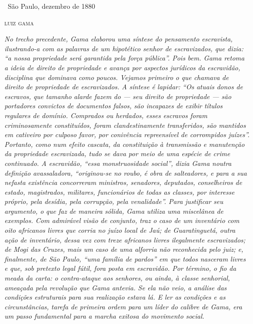 \hfill\ São Paulo, dezembro de 1880

\hfill\textsc{luiz gama}


\begin{resumo}
\emph{No trecho precedente, Gama elaborou uma síntese do pensamento
escravista, ilustrando-a com as palavras de um hipotético senhor de
escravizados, que dizia: ``a nossa propriedade será garantida pela força
pública''. Pois bem. Gama retoma a ideia de direito de propriedade e
avança por aspectos jurídicos da escravidão, disciplina que dominava
como poucos. Vejamos primeiro o que chamava de direito de propriedade de
escravizados. A síntese é lapidar: ``Os atuais donos de escravos, que
tamanho alarde fazem do --- seu direito de propriedade --- são portadores
convictos de documentos falsos, são incapazes de exibir títulos
regulares de domínio. Comprados ou herdados, esses escravos foram
criminosamente constituídos, foram clandestinamente transferidos, são
mantidos em cativeiro por culposo favor, por conivência repreensível de
corrompidos juízes''. Portanto, como num efeito cascata, da constituição
à transmissão e manutenção da propriedade escravizada, tudo se dava por
meio de uma espécie de crime continuado. A escravidão, ``essa
monstruosidade social'', dizia Gama noutra definição avassaladora,
``originou-se no roubo, é obra de salteadores, e para a sua nefasta
existência concorreram ministros, senadores, deputados, conselheiros de
estado, magistrados, militares, funcionários de todas as classes, por
interesse próprio, pela desídia, pela corrupção, pela venalidade''. Para
justificar seu argumento, o que faz de maneira sólida, Gama utiliza uma
miscelânea de exemplos. Com admirável visão de conjunto, traz o caso de
um inventário com oito africanos livres que corria no juízo local de
Jaú; de Guaratinguetá, outra ação de inventário, dessa vez com treze
africanos livres ilegalmente escravizados; de Mogi das Cruzes, mais um
caso de uma alforria não reconhecida pelo juiz; e, finalmente, de São
Paulo, ``uma família de pardos'' em que todos nasceram livres e que, sob
pretexto legal fútil, fora posta em escravidão. Por término, o fio da
meada da carta: o contra-ataque aos senhores, ou ainda, à classe
senhorial, ameaçada pela revolução que Gama antevia. Se ela
não veio, a análise das condições estruturais para sua realização estava lá. E ler as condições e as circunstâncias, tarefa de
primeira ordem para um líder do calibre de Gama, era um passo
fundamental para a marcha exitosa do movimento social.}
\end{resumo}

